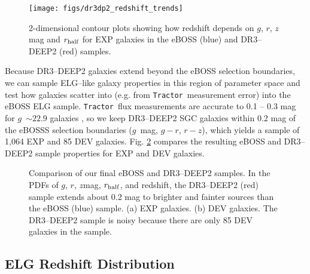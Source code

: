 \documentclass[a4paper,fleqn,usenatbib]{mnras}
\newcommand{\rhalf}{r_{\rm{half}}}
\newcommand{\gb}{$g$}
\newcommand{\rband}{$r$}
\newcommand{\zb}{$z$}
\newcommand{\tractor}{{\tt Tractor}}
\begin{document}
\begin{figure}
\begin{center}
 \texttt{[image: figs/dr3dp2\_redshift\_trends]}
\end{center}
 \caption[Redshift dependence of the eBOSS and DR3--DEEP2 samples]{2-dimensional contour plots showing how redshift depends on \gb, \rband, \zb\, mag and $\rhalf$ for EXP galaxies in the eBOSS (blue) and DR3--DEEP2 (red) samples.}
 \label{fig:dr3dp2-redshift}
\end{figure}

\noindent Because DR3--DEEP2 galaxies extend beyond the eBOSS selection boundaries, we can sample ELG--like galaxy properties in this region of parameter space and test how galaxies scatter into (e.g. from \tractor\, measurement error) into the eBOSS ELG sample. \tractor\, flux measurements are accurate to 0.1 -- 0.3 mag for \gb\, $\sim 22.9$ galaxies \citep{obiwanMethods}, so we keep DR3--DEEP2 SGC galaxies within 0.2 mag of the eBOSSS selection boundaries (\gb\, mag, $g-r$, $r-z$), which yields a sample of 1,064 EXP and 85 DEV galaxies. Fig. \ref{fig:dr3dp2-vs-eboss} compares the resulting eBOSS and DR3--DEEP2 sample properties for EXP and DEV galaxies.

\begin{figure}
\begin{center}
     \hfill
\end{center}
\caption[Comparison of our final eBOSS and DR3--DEEP2 samples]{Comparison of our final eBOSS and DR3--DEEP2 samples. In the PDFs of \gb, \rband, \zb mag, $\rhalf$, and redshift, the DR3--DEEP2 (red) sample extends about 0.2 mag to brighter and fainter sources than the eBOSS (blue) sample. (a) EXP galaxies. (b) DEV galaxies. The DR3--DEEP2 sample is noisy because there are only 85 DEV galaxies in the sample.}
\label{fig:dr3dp2-vs-eboss}
\end{figure}


\subsection{ELG Redshift Distribution}
\label{sec:final-eboss-sample}
\end{document}
